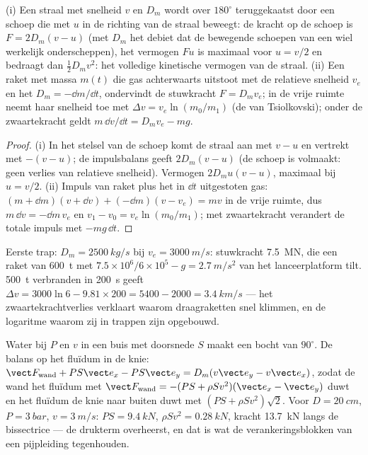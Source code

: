 \begin{proposition}\label{prop:b2:flow-balances:pelton}
(i) Een straal met snelheid $v$ en  $D_m$ wordt over $180^\circ$
teruggekaatst door een schoep die met $u$ in de richting van de straal
beweegt: de kracht op de schoep is $F = 2D_m(v - u)$ (met $D_m$ het debiet
dat de bewegende schoepen van een wiel werkelijk onderscheppen), het
vermogen $Fu$ is maximaal voor $u = v/2$ en bedraagt dan $\tfrac12D_mv^2$:
het volledige kinetische vermogen van de straal. (ii) Een raket met massa
$m(t)$ die gas achterwaarts uitstoot met de relatieve snelheid $v_e$ en het
 $D_m = -\dd m/\dd t$, ondervindt de stuwkracht $F = D_mv_e$; in
de vrije ruimte neemt haar snelheid toe met $\Delta v = v_e\ln(m_0/m_1)$ (de
 van Tsiolkovski); onder de zwaartekracht geldt
$m\,\dd v/\dd t = D_mv_e - mg$.
\end{proposition}

\begin{proof}
(i) In het stelsel van de schoep komt de straal aan met $v - u$ en vertrekt
met $-(v - u)$; de impulsbalans geeft $2D_m(v - u)$ (de schoep is volmaakt:
geen verlies van relatieve snelheid). Vermogen $2D_mu(v - u)$, maximaal bij
$u = v/2$. (ii) Impuls van raket plus het in $\dd t$ uitgestoten gas:
$(m + \dd m)
(v + \dd v) + (-\dd m)(v - v_e) = mv$ in de vrije ruimte, dus
$m\,\dd v = -\dd m\,v_e$ en $v_1 - v_0 = v_e\ln(m_0/m_1)$; met zwaartekracht
verandert de totale impuls met $-mg\,\dd t$.
\end{proof}

\begin{example}\label{ex:b2:flow-balances:rocket}
Eerste trap: $D_m = \qty{2500}{kg/s}$ bij $v_e = \qty{3000}{m/s}$:
stuwkracht \qty{7.5}{MN}, die een raket van \qty{600}{t} met
$7.5 \times 10^6/6 \times 10^5 - g
= \qty{2.7}{m/s^2}$ van het
lanceerplatform tilt. \qty{500}{t} verbranden in \qty{200}{s} geeft
$\Delta v = 3000\ln6 - 9.81 \times 200 = 5400 - 2000 = \qty{3.4}{km/s}$ ---
het zwaartekrachtverlies verklaart waarom draagraketten snel klimmen, en de
logaritme waarom zij in trappen zijn opgebouwd.
\end{example}

\begin{example}\label{ex:b2:flow-balances:bend}
Water bij $P$ en $v$ in een buis met doorsnede $S$ maakt een bocht van
$90^\circ$. De balans op het fluïdum in de knie:
$\vect F_{\text{wand}} + PS\vect e_x - PS
\vect e_y = D_m(v\vect e_y - v\vect e_x)$,
zodat de wand het fluïdum met
$\vect F_{\text{wand}} = -(PS + \rho Sv^2)(\vect e_x - \vect e_y)$ duwt en
het fluïdum de knie naar buiten duwt met $(PS + \rho Sv^2)\sqrt2$. Voor
$D = \qty{20}{cm}$, $P = \qty{3}{bar}$, $v = \qty{3}{m/s}$:
$PS = \qty{9.4}{kN}$, $\rho Sv^2 = \qty{0.28}{kN}$, kracht \qty{13.7}{kN}
langs de bissectrice --- de drukterm overheerst, en dat is wat de
verankeringsblokken van een pijpleiding tegenhouden.
\end{example}

